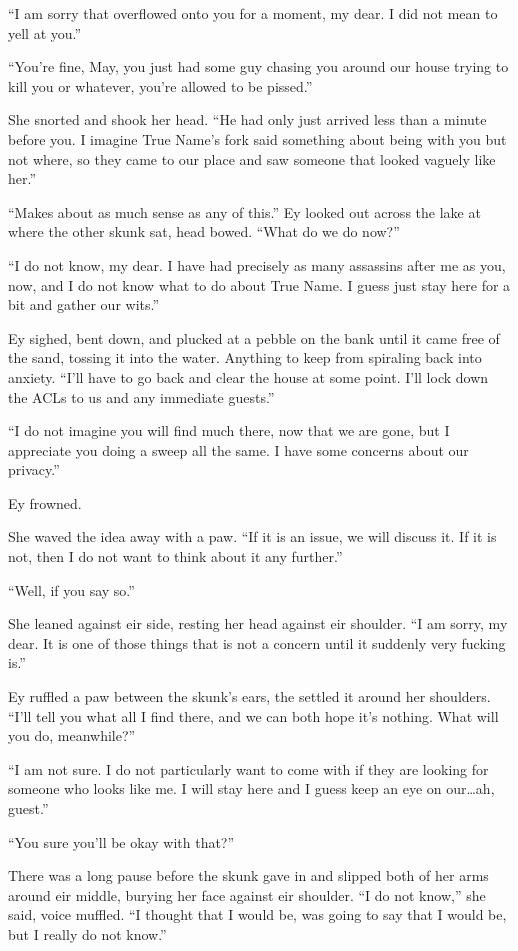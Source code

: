 ``I am sorry that overflowed onto you for a moment, my dear. I did not mean to yell at you.''

``You're fine, May, you just had some guy chasing you around our house trying to kill you or whatever, you're allowed to be pissed.''

She snorted and shook her head. ``He had only just arrived less than a minute before you. I imagine True Name's fork said something about being with you but not where, so they came to our place and saw someone that looked vaguely like her.''

``Makes about as much sense as any of this.'' Ey looked out across the lake at where the other skunk sat, head bowed. ``What do we do now?''

``I do not know, my dear. I have had precisely as many assassins after me as you, now, and I do not know what to do about True Name. I guess just stay here for a bit and gather our wits.''

Ey sighed, bent down, and plucked at a pebble on the bank until it came free of the sand, tossing it into the water. Anything to keep from spiraling back into anxiety. ``I'll have to go back and clear the house at some point. I'll lock down the ACLs to us and any immediate guests.''

``I do not imagine you will find much there, now that we are gone, but I appreciate you doing a sweep all the same. I have some concerns about our privacy.''

Ey frowned.

She waved the idea away with a paw. ``If it is an issue, we will discuss it. If it is not, then I do not want to think about it any further.''

``Well, if you say so.''

She leaned against eir side, resting her head against eir shoulder. ``I am sorry, my dear. It is one of those things that is not a concern until it suddenly very fucking is.''

Ey ruffled a paw between the skunk's ears, the settled it around her shoulders. ``I'll tell you what all I find there, and we can both hope it's nothing. What will you do, meanwhile?''

``I am not sure. I do not particularly want to come with if they are looking for someone who looks like me. I will stay here and I guess keep an eye on our\ldots ah, guest.''

``You sure you'll be okay with that?''

There was a long pause before the skunk gave in and slipped both of her arms around eir middle, burying her face against eir shoulder. ``I do not know,'' she said, voice muffled. ``I thought that I would be, was going to say that I would be, but I really do not know.''

